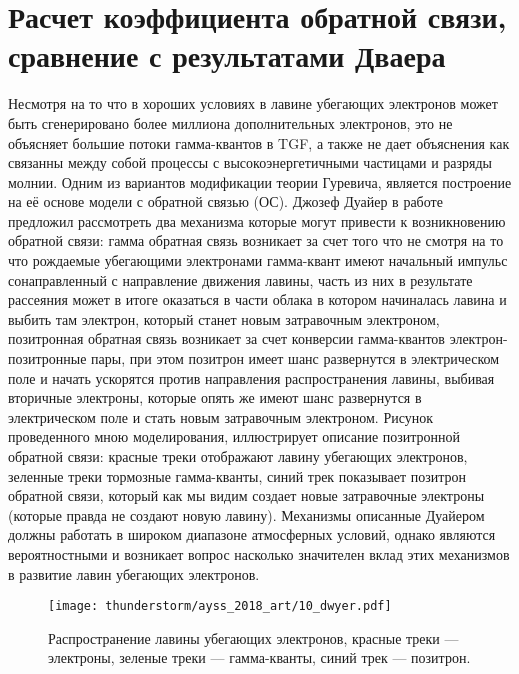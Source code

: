 \section{Расчет коэффициента обратной связи, сравнение с результатами Дваера}\label{sec:thunderstorm/rdfm}

Несмотря на то что в хороших условиях в лавине убегающих электронов может быть сгенерировано более миллиона дополнительных электронов, это не объясняет большие потоки гамма-квантов в TGF, а также не дает объяснения как связанны между собой процессы с высокоэнергетичными частицами и разряды молнии. Одним из вариантов модификации теории Гуревича, является построение на её основе модели с обратной связью (ОС). Джозеф Дуайер в работе~\cite{dwyer2003fundamental} предложил рассмотреть два механизма которые могут привести к возникновению обратной связи: гамма обратная связь возникает за счет того что не смотря на то что рождаемые убегающими электронами гамма-квант имеют начальный импульс сонаправленный с направление движения лавины, часть из них в результате рассеяния может в итоге оказаться в части облака в котором начиналась лавина и выбить там электрон, который станет новым затравочным электроном, позитронная обратная связь возникает за счет конверсии гамма-квантов электрон-позитронные пары, при этом позитрон имеет шанс развернутся в электрическом поле и начать ускорятся против направления распространения лавины, выбивая вторичные электроны, которые опять же имеют шанс развернутся в электрическом поле и стать новым затравочным электроном. Рисунок проведенного мною моделирования, иллюстрирует описание позитронной обратной связи: красные треки отображают лавину убегающих электронов, зеленные треки тормозные гамма-кванты, синий трек показывает позитрон обратной связи, который как мы видим создает новые затравочные электроны (которые правда не создают новую лавину). Механизмы описанные Дуайером должны работать в широком диапазоне атмосферных условий, однако являются вероятностными и возникает вопрос насколько значителен вклад этих механизмов в развитие лавин убегающих электронов.

\begin{figure}[ph!]
    \begin{center}
        \texttt{[image: thunderstorm/ayss\_2018\_art/10\_dwyer.pdf]}
        \caption{Распространение лавины убегающих электронов, красные треки --- электроны, зеленые треки --- гамма-кванты, синий трек --- позитрон.}
    \end{center}
    \label{fig:storm:dwyer}
\end{figure}

